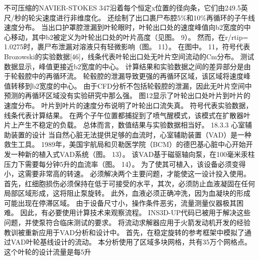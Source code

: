 \documentclass[UTF8,11pt,a4paper,openany,fontset=fandol]{ctexbook}
\begin{document}
不可压缩的NAVIER-STOKES 347沿着每个恒定x位置的径向条，它们由249.5英尺/秒的轮尖速度进行非维度化。 还绘制了出口裹尸布腔5\%和10\%再循环的子午线速度分布。 当出口护罩腔泄漏到叶轮眼时，叶轮出口处的速度峰值向b2宽度的中心移动，其中b2被定义为叶轮出口处的叶片高度（见图。 9）。 然而，在r/rtip= 1.0275时，裹尸布泄漏对溶液只有轻微影响（图。 11）。 在图中。 11，符号代表Brozowski的实验数据[46]，线条代表叶轮出口处无叶片空间流动的Cm分布。 测试数据显示，峰值更接近b2宽度的中心。 计算结果和实验数据之间的差异部分是由于轮毂腔中的再循环流。 轮毂腔的泄漏导致更强的再循环区域，该区域将速度峰值转移到b2宽度的中心。 由于CFD分析不包括轮毂腔的泄漏，因此无叶片空间中预测的再循环区域没有实验研究中那么强。 图12显示了叶轮出口处叶片到叶片的速度分布。 叶片到叶片的速度分布说明了叶轮出口流失真。 符号代表实验数据，线条代表计算结果。 在两个子午位置都捕捉到了喷气醒模式，该模式在扩散器叶片上产生不稳定的负载。 总体而言，数值结果与实验数据相当好。 18.3.3 心室辅助装置的设计 当自然心脏无法提供足够的血流时，心室辅助装置（VAD）是一种救生工具。 1989年，美国宇航局和贝勒医学院（BCM）的德巴基心脏中心开始开发一种新的植入式VAD系统（图。 13）。 该VAD基于磁驱轴向泵，在100毫米汞柱压力下需要每分钟5升的血流率（图。 14）。 为了使其可植入，该设备必须变得小，这需要非常高的转速。 必须解决两个主要问题，才能使这一设计投入使用。 首先，红细胞损伤必须保持在低于可接受的水平，其次，必须防止血液凝固在任何局部区域形成，这将阻止泵旋转。 此外，血液必须正确冲洗，因为血凝块的形成可能出现在停滞区域。 由于设备尺寸小，操作条件恶劣，流量测量仪器极其困难。 因此，有必要使用计算技术来观察流程。 INS3D-UP代码已被用于解决这些问题，并使泵符合临床测试的要求。 将流动求解器应用于火箭发动机开发的经验教训被重新应用于VAD分析和设计中。 首先，在稳定旋转的参考框架中模拟了通过VAD叶轮基线设计的流动。 本分析使用了区域多块网格，共有35万个网格点。 这个叶轮的设计流量是每5升
\end{document}
